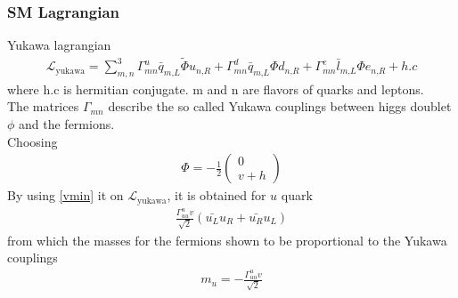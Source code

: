 \documentclass[11pt]{beamer}
\begin{document}
\begin{frame}
\frametitle{SM Lagrangian}
Yukawa lagrangian
\begin{align}
\mathcal{L}_\text{yukawa}=\sum_{m,n}^{3}  \Gamma^u_{mn}\bar{q}_{m\text{,}L} \tilde{\Phi} u_{n\text{,}R}+\Gamma^d_{mn}\bar{q}_{m\text{,}L} \Phi d_{n\text{,}R}+\Gamma^e_{mn}\bar{l}_{m\text{,}L} \Phi e_{n\text{,}R}+h.c
\end{align}
\scriptsize{where h.c is hermitian conjugate. m and n are flavors of quarks and leptons.
\\
The matrices $\Gamma_{mn}$ describe the so called Yukawa couplings between higgs doublet $\phi$ and the fermions.\\
Choosing}
\begin{align*}
\Phi=-\frac{1}{2}\left(\begin{array}{c}
0 \\
v+h
\end{array} \right) \label{vmin}
\end{align*}
\scriptsize{
By using \ref{vmin} it on $\mathcal{L}_\text{yukawa}$, it is obtained for $u$ quark
\begin{align*}
\frac{\Gamma^u_{uu}v}{\sqrt{2}}(\bar{u_L}u_R+\bar{u_R}u_L)
\end{align*}
from which the masses for the fermions shown to be proportional to the Yukawa couplings
\begin{align*}
m_u=-\frac{\Gamma^u_{uu}v}{\sqrt{2}}
\end{align*}}
\end{frame}
\end{document}
